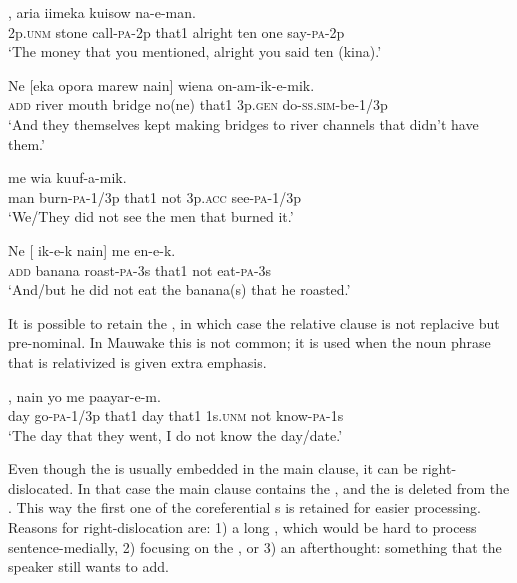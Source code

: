 \ea%
\label{ex:8:x1529}
,  aria  iimeka  kuisow  na-e-man. \\
2p.\textsc{unm} stone call-\textsc{pa}-2p that1 alright ten one say-\textsc{pa}-2p      \\
\glt`The money that you mentioned, alright you said ten (kina).'
\z


\ea%
\label{ex:8:x1530}
\gll Ne  [eka  opora    marew  nain]  wiena on-am-ik-e-mik. \\
\textsc{add} river  mouth  bridge  no(ne)  that1  3p.\textsc{gen} do-\textsc{ss}.\textsc{sim}-be-1/3p\\
\glt`And they themselves kept making bridges to river channels that didn't have them.' 
\z


\ea%
\label{ex:8:x1545}
  me  wia  kuuf-a-mik. \\
man  burn-\textsc{pa}-1/3p  that1  not  3p.\textsc{acc} see-\textsc{pa}-1/3p\\
\glt`We/They did not see the men that burned it.'
\z


\ea%
\label{ex:8:x1546}
\gll Ne  [  ik-e-k  nain]  me  en-e-k. \\
\textsc{add} banana  roast-\textsc{pa}-3s  that1  not  eat-\textsc{pa}-3s\\
\glt`And/but he did not eat the banana(s) that he roasted.'
\z


It is possible to retain the , in which case the relative clause is not replacive but pre-nominal. In Mauwake this is not common; it is used when the noun phrase that is relativized is given extra emphasis. 

\ea%
\label{ex:8:x1532}
,    nain  yo  me  paayar-e-m. \\
day  go-\textsc{pa}-1/3p  that1  day  that1  1s.\textsc{unm} not  know-\textsc{pa}-1s\\
\glt`The day that they went, I do not know the day/date.'
\z


Even though the  is usually embedded in the main clause, it can be right-dislocated. In that case the main clause contains the , and the  is deleted from the . This way the first one of the coreferential s is retained for easier processing. Reasons for right-dislocation are: 1) a long , which would be hard to process sentence-medially, 2) focusing on the , or 3) an afterthought: something that the speaker still wants to add.

